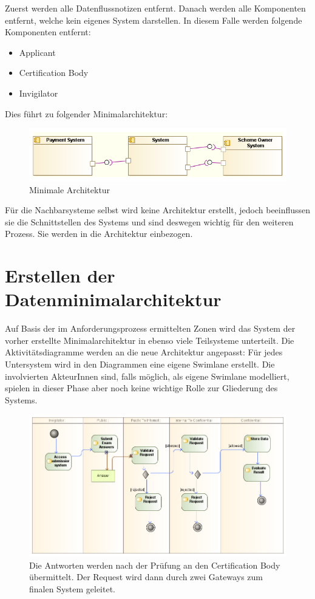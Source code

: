 Zuerst werden alle Datenflussnotizen entfernt. Danach werden alle Komponenten entfernt, welche kein eigenes System darstellen. In diesem Falle werden folgende Komponenten entfernt:

\begin{itemize}
  \item Applicant
  \item Certification Body
  \item Invigilator
\end{itemize}

Dies führt zu folgender Minimalarchitektur:

\begin{figure}[H]
    \centering
    \includegraphics[scale=0.7]{uml/minimalarch.png}
    \caption{Minimale Architektur}
\end{figure}

Für die Nachbarsysteme selbst wird keine Architektur erstellt, jedoch beeinflussen sie die Schnittstellen des Systems und sind deswegen wichtig für den weiteren Prozess. Sie werden in die Architektur einbezogen.

\section{Erstellen der Datenminimalarchitektur}
Auf Basis der im Anforderungsprozess ermittelten Zonen wird das System der vorher erstellte Minimalarchitektur in ebenso viele Teilsysteme unterteilt. Die Aktivitätsdiagramme werden an die neue Architektur angepasst: Für jedes Untersystem wird in den Diagrammen eine eigene Swimlane erstellt. Die involvierten AkteurInnen sind, falls möglich, als eigene Swimlane modelliert, spielen in dieser Phase aber noch keine wichtige Rolle zur Gliederung des Systems.

\begin{figure}[H]
    \centering
    \includegraphics[scale=0.5]{uml/takeexamactivity1.png}
    \caption{Die Antworten werden nach der Prüfung an den Certification Body übermittelt. Der Request wird dann durch zwei Gateways zum finalen System geleitet.}
\end{figure}

